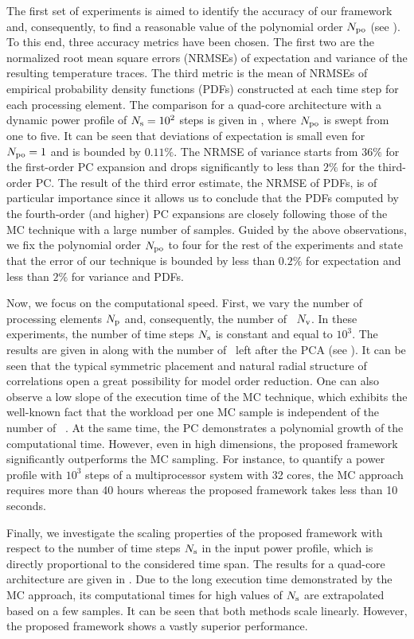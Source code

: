 
The first set of experiments is aimed to identify the accuracy of our framework and, consequently, to find a reasonable value of the polynomial order ${N_\text{po}}$ (see ). To this end, three accuracy metrics have been chosen. The first two are the normalized root mean square errors (NRMSEs) of expectation and variance of the resulting temperature traces. The third metric is the mean of NRMSEs of empirical probability density functions (PDFs) constructed at each time step for each processing element. The comparison for a quad-core architecture with a dynamic power profile of $N_\text{s} = 10^2$ steps is given in , where ${N_\text{po}}$ is swept from one to five. It can be seen that deviations of expectation is small even for ${N_\text{po}} = 1$ and is bounded by $0.11\%$. The NRMSE of variance starts from $36\%$ for the first-order PC expansion and drops significantly to less than $2\%$ for the third-order PC. The result of the third error estimate, the NRMSE of PDFs, is of particular importance since it allows us to conclude that the PDFs computed by the fourth-order (and higher) PC expansions are closely following those of the MC technique with a large number of samples. Guided by the above observations, we fix the polynomial order ${N_\text{po}}$ to four for the rest of the experiments and state that the error of our technique is bounded by less than $0.2\%$ for expectation and less than $2\%$ for variance and PDFs.


Now, we focus on the computational speed. First, we vary the number of processing elements ${N_\text{p}}$ and, consequently, the number of \rvs\ ${N_\text{v}}$. In these experiments, the number of time steps $N_\text{s}$ is constant and equal to $10^3$. The results are given in  along with the number of \rvs\ left after the PCA (see ). It can be seen that the typical symmetric placement and natural radial structure of correlations \cite{cheng2011} open a great possibility for model order reduction. One can also observe a low slope of the execution time of the MC technique, which exhibits the well-known fact that the workload per one MC sample is independent of the number of \rvs\  \cite{maitre2010}. At the same time, the PC demonstrates a polynomial growth \cite{heiss2008} of the computational time. However, even in high dimensions, the proposed framework significantly outperforms the MC sampling. For instance, to quantify a power profile with $10^3$ steps of a multiprocessor system with 32 cores, the MC approach requires more than 40 hours whereas the proposed framework takes less than 10 seconds.

Finally, we investigate the scaling properties of the proposed framework with respect to the number of time steps $N_\text{s}$ in the input power profile, which is directly proportional to the considered time span. The results for a quad-core architecture are given in . Due to the long execution time demonstrated by the MC approach, its computational times for high values of $N_\text{s}$ are extrapolated based on a few samples. It can be seen that both methods scale linearly. However, the proposed framework shows a vastly superior performance.
